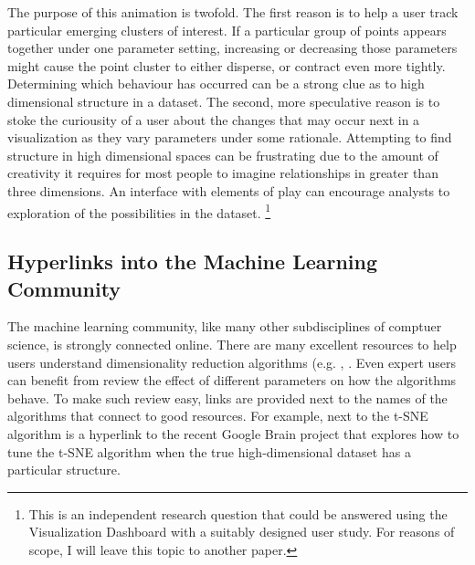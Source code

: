 \documentclass{sigchi}
\begin{document}
The purpose of this animation is twofold. %
%
The first reason is to help a user track particular emerging clusters of interest. %
%
If a particular group of points appears together under one parameter setting, increasing or decreasing those parameters might cause the point cluster to either disperse, or contract even more tightly. %
%
Determining which behaviour has occurred can be a strong clue as to high dimensional structure in a dataset. %
%
The second, more speculative reason is to stoke the curiousity of a user about the changes that may occur next in a visualization as they vary parameters under some rationale. %
%
Attempting to find structure in high dimensional spaces can be frustrating due to the amount of creativity it requires for most people to imagine relationships in greater than three dimensions.
%
An interface with elements of play can encourage analysts to exploration of the possibilities in the dataset.%
%
\footnote{This is an independent research question that could be answered using the Visualization Dashboard with a suitably designed user study. For reasons of scope, I will leave this topic to another paper.} %
%
\subsection{Hyperlinks into the Machine Learning Community}
%
The machine learning community, like many other subdisciplines of comptuer science, is strongly connected online. %
%
There are many excellent resources to help users understand dimensionality reduction algorithms (e.g. \cite{wattenberg2016how}, \cite{setosaPCA}. %
%
Even expert users can benefit from review the effect of different parameters on how the algorithms behave. %
%
To make such review easy, links are provided next to the names of the algorithms that connect to good resources. %
%
For example, next to the t-SNE algorithm is a hyperlink to the recent Google Brain project \cite{wattenberg2016how} that explores how to tune the t-SNE algorithm when the true high-dimensional dataset has a particular structure. %
%
\end{document}
